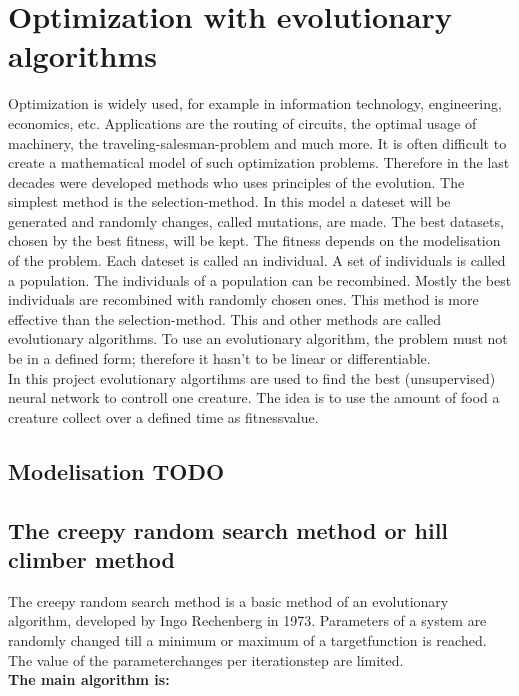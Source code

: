 \documentclass[10pt,a4paper,DIV=11]{scrreprt}
\begin{document}
\chapter{Optimization with evolutionary algorithms}
Optimization is widely used, for example in information technology, engineering,
economics, etc. Applications are the routing of circuits, the optimal usage of machinery,
the traveling-salesman-problem and much more. It is often difficult to create a mathematical
model of such optimization problems. Therefore in the last decades were developed methods who
uses principles of the evolution.
The simplest method is the selection-method. In this model a dateset will be generated and randomly
changes, called mutations, are made. The best datasets, chosen by the best fitness, will be kept. The fitness depends on the modelisation of the problem.
Each dateset is called an individual. A set of individuals is called a population. The individuals
of a population can be recombined. Mostly the best individuals are recombined with randomly chosen
ones. This method is more effective than the selection-method. This and other methods are  called
evolutionary algorithms. To use an evolutionary algorithm, the problem must not be in a defined form;
therefore it hasn't to be linear or differentiable. \\

In this project evolutionary algortihms are used to find the best 
(unsupervised) neural network to controll one creature. The idea is to use the amount of food a creature collect over a defined time as fitnessvalue.

\section{Modelisation TODO}

\section{The creepy random search method or hill climber method}
The creepy random search method is a basic method of an evolutionary algorithm, developed by Ingo Rechenberg in 1973. %
Parameters of a system are randomly changed till a minimum or maximum of a targetfunction is reached. The value of the parameterchanges per iterationstep are limited. \\

\textbf{The main algorithm is:}
\end{document}

